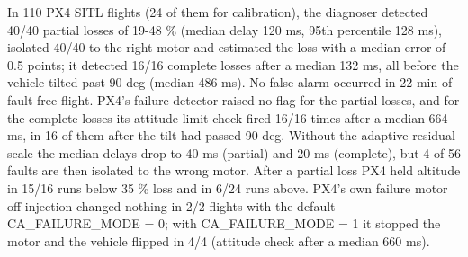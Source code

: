 In 110 PX4 SITL flights (24 of them for calibration), the diagnoser detected 40/40 partial losses of 19-48 \% (median delay 120 ms, 95th percentile 128 ms), isolated 40/40 to the right motor and estimated the loss with a median error of 0.5 points; it detected 16/16 complete losses after a median 132 ms, all before the vehicle tilted past 90 deg (median 486 ms). No false alarm occurred in 22 min of fault-free flight. PX4's failure detector raised no flag for the partial losses, and for the complete losses its attitude-limit check fired 16/16 times after a median 664 ms, in 16 of them after the tilt had passed 90 deg. Without the adaptive residual scale the median delays drop to 40 ms (partial) and 20 ms (complete), but 4 of 56 faults are then isolated to the wrong motor. After a partial loss PX4 held altitude in 15/16 runs below 35 \% loss and in 6/24 runs above. PX4's own failure motor off injection changed nothing in 2/2 flights with the default CA\_FAILURE\_MODE = 0; with CA\_FAILURE\_MODE = 1 it stopped the motor and the vehicle flipped in 4/4 (attitude check after a median 660 ms).
